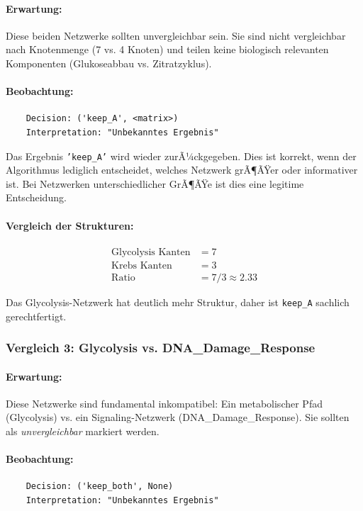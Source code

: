 ﻿\documentclass[a4paper,12pt]{article}
\theoremstyle{definition}
\begin{document}
\paragraph{Erwartung:}
Diese beiden Netzwerke sollten unvergleichbar sein. Sie sind nicht vergleichbar nach Knotenmenge (7 vs. 4 Knoten) und teilen keine biologisch relevanten Komponenten (Glukoseabbau vs. Zitratzyklus).

\paragraph{Beobachtung:}
\begin{verbatim}
	Decision: ('keep_A', <matrix>)
	Interpretation: "Unbekanntes Ergebnis"
\end{verbatim}

Das Ergebnis \texttt{'keep\_A'} wird wieder zurÃ¼ckgegeben. Dies ist korrekt, wenn der Algorithmus lediglich entscheidet, welches Netzwerk grÃ¶ÃŸer oder informativer ist. Bei Netzwerken unterschiedlicher GrÃ¶ÃŸe ist dies eine legitime Entscheidung.

\paragraph{Vergleich der Strukturen:}
\begin{align*}
	\text{Glycolysis Kanten} &= 7 \\
	\text{Krebs Kanten} &= 3 \\
	\text{Ratio} &= 7/3 \approx 2.33
\end{align*}

Das Glycolysis-Netzwerk hat deutlich mehr Struktur, daher ist \texttt{keep\_A} sachlich gerechtfertigt.

\subsubsection{Vergleich 3: Glycolysis vs. DNA\_Damage\_Response}

\paragraph{Erwartung:}
Diese Netzwerke sind fundamental inkompatibel: Ein metabolischer Pfad (Glycolysis) vs. ein Signaling-Netzwerk (DNA\_Damage\_Response). Sie sollten als \textit{unvergleichbar} markiert werden.

\paragraph{Beobachtung:}
\begin{verbatim}
	Decision: ('keep_both', None)
	Interpretation: "Unbekanntes Ergebnis"
\end{verbatim}
\end{document}
